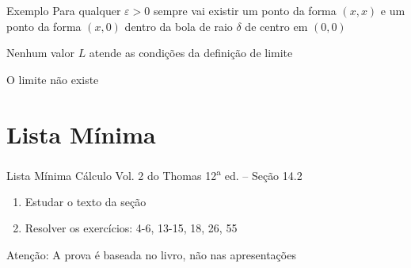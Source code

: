 \begin{frame}{Exemplo \theexemplo}
  Para qualquer $\varepsilon>0$
  \pause
  sempre vai existir um ponto da forma \((x, x)\) e um ponto da forma \((x, 0)\)
  \pause
  dentro da bola de raio $\delta$
  \pause
  de centro em \((0, 0)\)

  \pause
  Nenhum valor $L$ atende as condições da definição de limite

  \pause
  O limite não existe

\end{frame}

\section{Lista Mínima}

\begin{frame}{Lista Mínima}
  Cálculo Vol. 2 do Thomas 12\textsuperscript{a} ed. -- Seção 14.2
  \begin{enumerate}
    \item Estudar o texto da seção
    \item Resolver os exercícios: 4-6, 13-15, 18, 26, 55
  \end{enumerate}

  \vfill
  Atenção: A prova é baseada no livro, não nas apresentações
\end{frame}


